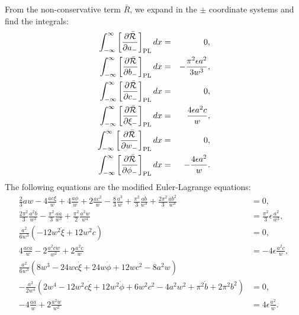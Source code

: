 From the non-conservative term $\bar{R}$, we expand in the $\pm$ coordinate systems and find the integrals:
\begin{eqnarray}
\int_{-\infty}^{\infty} \left[ \frac{\partial \bar{\mathcal{ R}}}{\partial a_-} \right]_{\rm PL} dx &=&  0, 
\nonumber  \\
\int_{-\infty}^{\infty} \left[ \frac{\partial  \bar{\mathcal{R}}}{\partial b_-} \right]_{\rm PL} dx &=& -\frac{\pi^2 \epsilon a^2}{3 w^3}, 
\nonumber \\
\int_{-\infty}^{\infty} \left[ \frac{\partial  \bar{\mathcal{R}}}{\partial c_-} \right]_{\rm PL} dx &=& 0, 
\nonumber \\
\int_{-\infty}^{\infty} \left[ \frac{\partial  \bar{\mathcal{R}}}{\partial \xi_-} \right]_{\rm PL} dx &=&  \frac{4 \epsilon a^2 c}{w}, 
\nonumber \\
\int_{-\infty}^{\infty} \left[ \frac{\partial  \bar{\mathcal{R}}}{\partial w_-} \right]_{\rm PL} dx &=& 0, 
\nonumber \\
\int_{-\infty}^{\infty} \left[ \frac{\partial  \bar{\mathcal{R}}}{\partial \phi_-} \right]_{\rm PL} dx &=&  -\frac{4 \epsilon a^2}{w}. 
\nonumber 
\end{eqnarray}
The following equations are the modified Euler-Lagrange equations:
\begin{align} 
\frac{2}{3} a w - 4\frac{a c \dot{\xi}}{w}+4\frac{a \dot{\phi} }{w}+2 \frac{a c^2}{w}-\frac{8}{3} \frac{a^3}{w}+\frac{\pi^2}{3} \frac{a \dot{b}}{w^3}+\frac{2 \pi^2}{3} \frac{a b^2}{w^3}  &= 0, \nonumber \\ 
\frac{2\pi^2}{3} \frac{a^2 b}{w^3}-\frac{\pi^2}{3} \frac{a \dot{a}}{w^3}+\frac{\pi^2}{2}\frac{a^2\dot{w}}{w^4} &= \frac{\pi^2}{3}\epsilon\frac{a^2}{w^3}, \nonumber \\ 
\frac{a^2}{6 w^3} (-12w^2\dot{\xi}+12w^2c) &= 0, \nonumber \\ 
4\frac{a c \dot{a}}{w} -2\frac{a^2 c \dot{w}}{w^2}+2\frac{a^2 \dot{c}}{w}  &= -4 \epsilon\frac{a^2c}{w},\nonumber  \\
\frac{a^2}{6 w^3} (8 w^3-24wc\dot{\xi}+24w\dot{\phi}+12wc^2-8a^2w) & \nonumber \\
-\frac{a^2}{2w^4} (2w^4-12w^2c\dot{\xi}+12w^2\dot{\phi}+6w^2c^2-4a^2w^2+\pi^2\dot{b}+2\pi^2b^2) &= 0, \nonumber \\
-4\frac{a\dot{a}}{w}+2\frac{a^2\dot{w}}{w^2} &= 4\epsilon\frac{a^2}{w}. 
\label{eq:elll}
\end{align}
